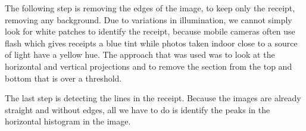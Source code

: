 The following step is removing the edges of the image, to keep only the receipt, removing any background. Due to variations in illumination, we cannot simply look for white patches to identify the receipt, because mobile cameras often use flash which gives receipts a blue tint while photos taken indoor close to a source of light have a yellow hue. The approach that was used was to look at the horizontal and vertical projections and to remove the section from the top and bottom that is over a threshold. 

The last step is detecting the lines in the receipt. Because the images are already straight and without edges, all we have to do is identify the peaks in the horizontal histogram in the image.  